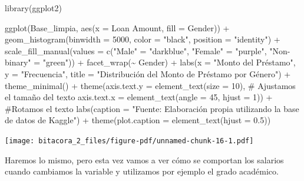 \documentclass[
  letterpaper,
  DIV=11,
  numbers=noendperiod]{scrreprt}
\newenvironment{Shaded}{\begin{snugshade}}{\end{snugshade}}
\newcommand{\AttributeTok}[1]{\textcolor[rgb]{0.40,0.45,0.13}{#1}}
\newcommand{\CommentTok}[1]{\textcolor[rgb]{0.37,0.37,0.37}{#1}}
\newcommand{\DecValTok}[1]{\textcolor[rgb]{0.68,0.00,0.00}{#1}}
\newcommand{\FloatTok}[1]{\textcolor[rgb]{0.68,0.00,0.00}{#1}}
\newcommand{\FunctionTok}[1]{\textcolor[rgb]{0.28,0.35,0.67}{#1}}
\newcommand{\NormalTok}[1]{\textcolor[rgb]{0.00,0.23,0.31}{#1}}
\newcommand{\OtherTok}[1]{\textcolor[rgb]{0.00,0.23,0.31}{#1}}
\newcommand{\SpecialCharTok}[1]{\textcolor[rgb]{0.37,0.37,0.37}{#1}}
\newcommand{\StringTok}[1]{\textcolor[rgb]{0.13,0.47,0.30}{#1}}
\begin{document}
\begin{Shaded}
\begin{Highlighting}[]
\FunctionTok{library}\NormalTok{(ggplot2)}

\FunctionTok{ggplot}\NormalTok{(Base\_limpia, }\FunctionTok{aes}\NormalTok{(}\AttributeTok{x =} \StringTok{\textasciigrave{}}\AttributeTok{Loan Amount}\StringTok{\textasciigrave{}}\NormalTok{, }\AttributeTok{fill =}\NormalTok{ Gender)) }\SpecialCharTok{+}  
  \FunctionTok{geom\_histogram}\NormalTok{(}\AttributeTok{binwidth =} \DecValTok{5000}\NormalTok{, }\AttributeTok{color =} \StringTok{"black"}\NormalTok{, }\AttributeTok{position =} \StringTok{"identity"}\NormalTok{) }\SpecialCharTok{+}  
  \FunctionTok{scale\_fill\_manual}\NormalTok{(}\AttributeTok{values =} \FunctionTok{c}\NormalTok{(}\StringTok{"Male"} \OtherTok{=} \StringTok{"darkblue"}\NormalTok{, }\StringTok{"Female"} \OtherTok{=} \StringTok{"purple"}\NormalTok{, }\StringTok{"Non{-}binary"} \OtherTok{=} \StringTok{"green"}\NormalTok{)) }\SpecialCharTok{+}  
  \FunctionTok{facet\_wrap}\NormalTok{(}\SpecialCharTok{\textasciitilde{}}\NormalTok{ Gender) }\SpecialCharTok{+}  
  \FunctionTok{labs}\NormalTok{(}\AttributeTok{x =} \StringTok{"Monto del Préstamo"}\NormalTok{, }\AttributeTok{y =} \StringTok{"Frecuencia"}\NormalTok{, }\AttributeTok{title =} \StringTok{"Distribución del Monto de Préstamo por Género"}\NormalTok{) }\SpecialCharTok{+} 
  \FunctionTok{theme\_minimal}\NormalTok{() }\SpecialCharTok{+}
  \FunctionTok{theme}\NormalTok{(}\AttributeTok{axis.text.y =} \FunctionTok{element\_text}\NormalTok{(}\AttributeTok{size =} \DecValTok{10}\NormalTok{), }\CommentTok{\# Ajustamos el tamaño del texto}
        \AttributeTok{axis.text.x =} \FunctionTok{element\_text}\NormalTok{(}\AttributeTok{angle =} \DecValTok{45}\NormalTok{, }\AttributeTok{hjust =} \DecValTok{1}\NormalTok{)) }\SpecialCharTok{+} \CommentTok{\#Rotamos el texto}
  \FunctionTok{labs}\NormalTok{(}\AttributeTok{caption =} \StringTok{"Fuente: Elaboración propia utilizando la base de datos de Kaggle"}\NormalTok{) }\SpecialCharTok{+}
\FunctionTok{theme}\NormalTok{(}\AttributeTok{plot.caption =} \FunctionTok{element\_text}\NormalTok{(}\AttributeTok{hjust =} \FloatTok{0.5}\NormalTok{)) }
\end{Highlighting}
\end{Shaded}

\texttt{[image: bitacora\_2\_files/figure-pdf/unnamed-chunk-16-1.pdf]}

Haremos lo mismo, pero esta vez vamos a ver cómo se comportan los
salarios cuando cambiamos la variable y utilizamos por ejemplo el grado
académico.
\end{document}
